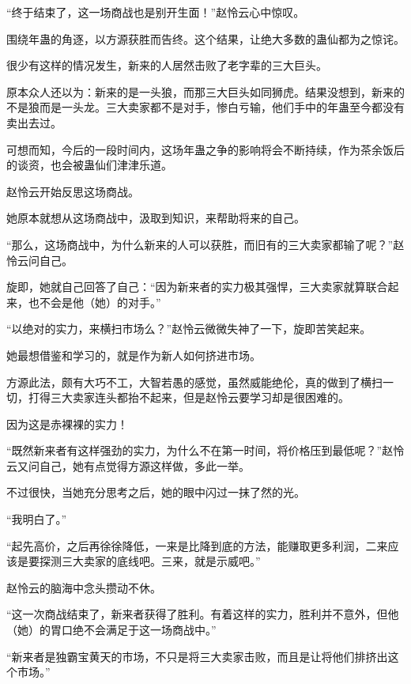 
\begin{this_body}



“终于结束了，这一场商战也是别开生面！”赵怜云心中惊叹。

围绕年蛊的角逐，以方源获胜而告终。这个结果，让绝大多数的蛊仙都为之惊诧。

很少有这样的情况发生，新来的人居然击败了老字辈的三大巨头。

原本众人还以为：新来的是一头狼，而那三大巨头如同狮虎。结果没想到，新来的不是狼而是一头龙。三大卖家都不是对手，惨白亏输，他们手中的年蛊至今都没有卖出去过。

可想而知，今后的一段时间内，这场年蛊之争的影响将会不断持续，作为茶余饭后的谈资，也会被蛊仙们津津乐道。

赵怜云开始反思这场商战。

她原本就想从这场商战中，汲取到知识，来帮助将来的自己。

“那么，这场商战中，为什么新来的人可以获胜，而旧有的三大卖家都输了呢？”赵怜云问自己。

旋即，她就自己回答了自己：“因为新来者的实力极其强悍，三大卖家就算联合起来，也不会是他（她）的对手。”

“以绝对的实力，来横扫市场么？”赵怜云微微失神了一下，旋即苦笑起来。

她最想借鉴和学习的，就是作为新人如何挤进市场。

方源此法，颇有大巧不工，大智若愚的感觉，虽然威能绝伦，真的做到了横扫一切，打得三大卖家连头都抬不起来，但是赵怜云要学习却是很困难的。

因为这是赤裸裸的实力！

“既然新来者有这样强劲的实力，为什么不在第一时间，将价格压到最低呢？”赵怜云又问自己，她有点觉得方源这样做，多此一举。

不过很快，当她充分思考之后，她的眼中闪过一抹了然的光。

“我明白了。”

“起先高价，之后再徐徐降低，一来是比降到底的方法，能赚取更多利润，二来应该是要探测三大卖家的底线吧。三来，就是示威吧。”

赵怜云的脑海中念头攒动不休。

“这一次商战结束了，新来者获得了胜利。有着这样的实力，胜利并不意外，但他（她）的胃口绝不会满足于这一场商战中。”

“新来者是独霸宝黄天的市场，不只是将三大卖家击败，而且是让将他们排挤出这个市场。”


\end{this_body}
